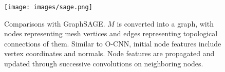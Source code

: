 \begin{figure}[t]
\centering
  \texttt{[image: images/sage.png]}
\caption{Comparisons with GraphSAGE. $M$ is converted into a graph, with nodes representing mesh vertices and edges representing topological connections of them. Similar to O-CNN, initial node features include vertex coordinates and normals. Node features are propagated and updated through successive convolutions on neighboring nodes. }
  \label{fig:different-methods}    
\end{figure}